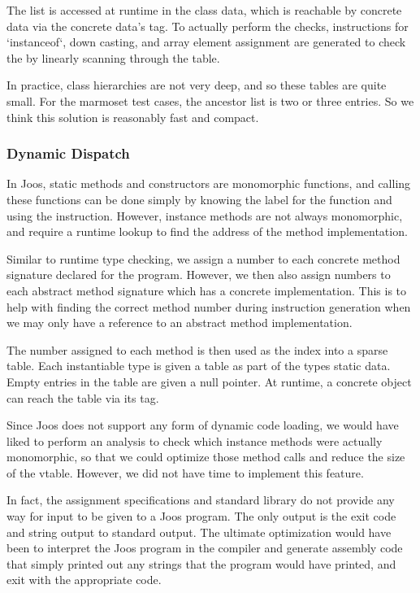 \documentclass[pdftex,11pt,a4paper]{article}
\begin{document}
The list is accessed at runtime in the class data, which is reachable
by concrete data via the concrete data's tag. To actually perform the
checks, instructions for `instanceof`, down casting, and array element
assignment are generated to check the  by
linearly scanning through the table.

In practice, class hierarchies are not very deep, and so these tables
are quite small. For the marmoset test cases, the ancestor list is two
or three entries. So we think this solution is reasonably fast and
compact.

\subsubsection{Dynamic Dispatch}

In Joos, static methods and constructors are monomorphic functions,
and calling these functions can be done simply by knowing the label
for the function and using the  instruction. However,
instance methods are not always monomorphic, and require a runtime
lookup to find the address of the method implementation.

Similar to runtime type checking, we assign a number to each concrete
method signature declared for the program. However, we then also
assign numbers to each abstract method signature which has a concrete
implementation. This is to help with finding the correct method number
during instruction generation when we may only have a reference to an
abstract method implementation.

The number assigned to each method is then used as the index into a
sparse table. Each instantiable type is given a table as part of the
types static data. Empty entries in the table are given a null
pointer. At runtime, a concrete object can reach the table via its
tag.

Since Joos does not support any form of dynamic code loading, we would
have liked to perform an analysis to check which instance methods were
actually monomorphic, so that we could optimize those method calls and
reduce the size of the vtable. However, we did not have time to
implement this feature.

In fact, the assignment specifications and standard library do not
provide any way for input to be given to a Joos program. The only
output is the exit code and string output to standard output. The
ultimate optimization would have been to interpret the Joos program in
the compiler and generate assembly code that simply printed out any
strings that the program would have printed, and exit with the
appropriate code.
\end{document}

